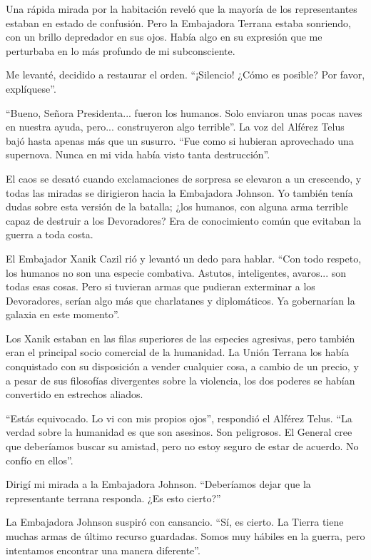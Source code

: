 Una rápida mirada por la habitación reveló que la mayoría de los representantes estaban en estado de confusión. Pero la Embajadora Terrana estaba sonriendo, con un brillo depredador en sus ojos. Había algo en su expresión que me perturbaba en lo más profundo de mi subconsciente.

Me levanté, decidido a restaurar el orden. ``¡Silencio! ¿Cómo es posible? Por favor, explíquese''.

``Bueno, Señora Presidenta... fueron los humanos. Solo enviaron unas pocas naves en nuestra ayuda, pero... construyeron algo terrible''. La voz del Alférez Telus bajó hasta apenas más que un susurro. ``Fue como si hubieran aprovechado una supernova. Nunca en mi vida había visto tanta destrucción''.

El caos se desató cuando exclamaciones de sorpresa se elevaron a un crescendo, y todas las miradas se dirigieron hacia la Embajadora Johnson. Yo también tenía dudas sobre esta versión de la batalla; ¿los humanos, con alguna arma terrible capaz de destruir a los Devoradores? Era de conocimiento común que evitaban la guerra a toda costa.

El Embajador Xanik Cazil rió y levantó un dedo para hablar. ``Con todo respeto, los humanos no son una especie combativa. Astutos, inteligentes, avaros... son todas esas cosas. Pero si tuvieran armas que pudieran exterminar a los Devoradores, serían algo más que charlatanes y diplomáticos. Ya gobernarían la galaxia en este momento''.

Los Xanik estaban en las filas superiores de las especies agresivas, pero también eran el principal socio comercial de la humanidad. La Unión Terrana los había conquistado con su disposición a vender cualquier cosa, a cambio de un precio, y a pesar de sus filosofías divergentes sobre la violencia, los dos poderes se habían convertido en estrechos aliados.

``Estás equivocado. Lo vi con mis propios ojos'', respondió el Alférez Telus. ``La verdad sobre la humanidad es que son asesinos. Son peligrosos. El General cree que deberíamos buscar su amistad, pero no estoy seguro de estar de acuerdo. No confío en ellos''.

Dirigí mi mirada a la Embajadora Johnson. ``Deberíamos dejar que la representante terrana responda. ¿Es esto cierto?''

La Embajadora Johnson suspiró con cansancio. ``Sí, es cierto. La Tierra tiene muchas armas de último recurso guardadas. Somos muy hábiles en la guerra, pero intentamos encontrar una manera diferente''.

